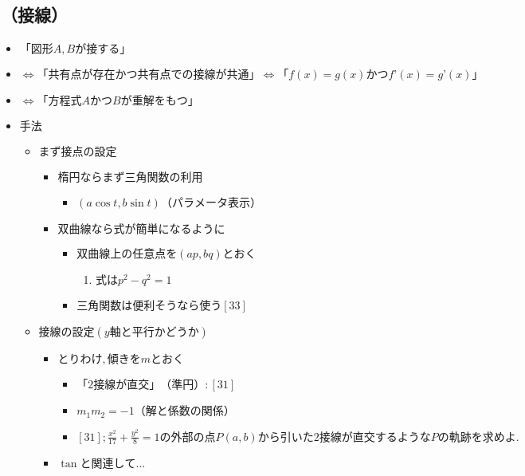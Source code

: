 \documentclass[dvipdfmx,uplatex]{jsarticle}
\begin{document}
\subsection{（接線）}
\begin{itemize}
	\item $ 「図形A,Bが接する」$
	\item $ \Leftrightarrow「共有点が存在かつ共有点での接線が共通」⇔「f(x) = g(x) かつ f’(x) = g’(x)」$
	\item $ \Leftrightarrow「方程式AかつBが重解をもつ」$
	\item $ 手法$
	\begin{itemize}
		\item $ まず接点の設定$
		\begin{itemize}
			\item $ 楕円ならまず三角関数の利用$
			\begin{itemize}
				\item $ (a\cos t, b\sin t)（パラメータ表示）$
			\end{itemize}
			\item $ 双曲線なら式が簡単になるように$
			\begin{itemize}
				\item $ 双曲線上の任意点を(ap, bq)とおく$
				\begin{enumerate}
					\item $ 式はp^2 - q^2 = 1$
				\end{enumerate}
				\item $ 三角関数は便利そうなら使う[33]$
			\end{itemize}
		\end{itemize}
		\item $ 接線の設定 (y軸と平行かどうか)$
		\begin{itemize}
			\item $ とりわけ,傾きをmとおく$
			\begin{itemize}
				\item $ 「2接線が直交」（準円）:[31]$
				\item $ m_1m_2 = -1（解と係数の関係）$
				\item $ [31]; \frac{x^2}{17}+\frac{y^2}{8}=1の外部の点P(a,b)から引いた2接線が直交するようなPの軌跡を求めよ.$
			\end{itemize}
			\item $ \tan と関連して…$
		\end{itemize}
	\end{itemize}
\end{itemize}
\end{document}
